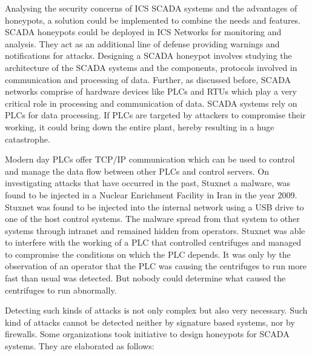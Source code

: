 \documentclass[article,msc=informatik,type=msc,colorback,accentcolor=tud9c]{tudthesis}
\begin{document}
	Analysing the security concerns of \ac{ICS} \ac{SCADA} systems and the advantages of honeypots, a solution could be implemented to combine the needs and features. \ac{SCADA} honeypots could be deployed in \ac{ICS}  Networks for monitoring and analysis. They act as an additional line of defense providing warnings and notifications for attacks. Designing a \ac{SCADA} honeypot involves studying the architecture of the \ac{SCADA} systems and the components, protocols involved in communication and processing of data. Further, as discussed before, \ac{SCADA} networks comprise of hardware devices like \ac{PLC}s and \ac{RTU}s which play a very critical role in processing and communication of data. \ac{SCADA} systems rely on \ac{PLC}s for data processing. If \ac{PLC}s are targeted by attackers to compromise their working, it could bring down the entire plant, hereby resulting in a huge catastrophe.
	
	\vspace{3mm}
	 Modern day \ac{PLC}s offer TCP/IP communication which can be used to control and manage the data flow between other \ac{PLC}s and control servers. On investigating attacks that have occurred in the past, Stuxnet a malware, was found to be injected in a Nuclear Enrichment Facility in Iran in the year 2009. Stuxnet was found to be injected into the internal network using a USB drive to one of the host control systems. The malware spread from that system to other systems through intranet and remained hidden from operators. Stuxnet was able to interfere with the working of a \ac{PLC} that controlled centrifuges and managed to compromise the conditions on which the \ac{PLC} depends. It was only by the observation of an operator that the \ac{PLC} was causing the centrifuges to run more fast than usual was detected. But nobody could determine what caused the centrifuges to run abnormally.  
	 
	 
	 
	\vspace{5mm} 
	Detecting such kinds of attacks is not only complex but also very necessary. Such kind of attacks cannot be detected neither by signature based systems, nor by firewalls. Some organizations took initiative to design honeypots for \ac{SCADA} systems. They are elaborated as follows:
	
\end{document}
